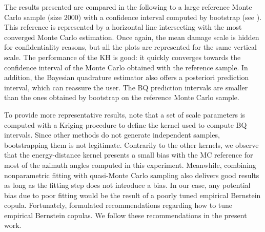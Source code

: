 The results presented are compared in the following to a large reference Monte Carlo sample (size $2000$) with a confidence interval computed by bootstrap (see ). 
This reference is represented by a horizontal line intersecting with the most converged Monte Carlo estimation.
Once again, the mean damage scale is hidden for confidentiality reasons, but all the plots are represented for the same vertical scale. 
The performance of the KH is good: it quickly converges towards the confidence interval of the Monte Carlo obtained with the reference sample. 
In addition, the Bayesian quadrature estimator also offers a posteriori prediction interval, which can reassure the user. 
The BQ prediction intervals are smaller than the ones obtained by bootstrap on the reference Monte Carlo sample. 

To provide more representative results, note that a set of scale parameters is computed with a Kriging procedure to define the kernel used to compute BQ intervals. 
Since other methods do not generate independent samples, bootstrapping them is not legitimate. 
Contrarily to the other kernels, we observe that the energy-distance kernel presents a small bias with the MC reference for most of the azimuth angles computed in this experiment. 
Meanwhile, combining nonparametric fitting with quasi-Monte Carlo sampling also delivers good results as long as the fitting step does not introduce a bias. 
In our case, any potential bias due to poor fitting would be the result of a poorly tuned empirical Bernstein copula. 
Fortunately, \cite{nagler_2017} formulated recommendations regarding how to tune empirical Bernstein copulas. 
We follow these recommendations in the present work.



